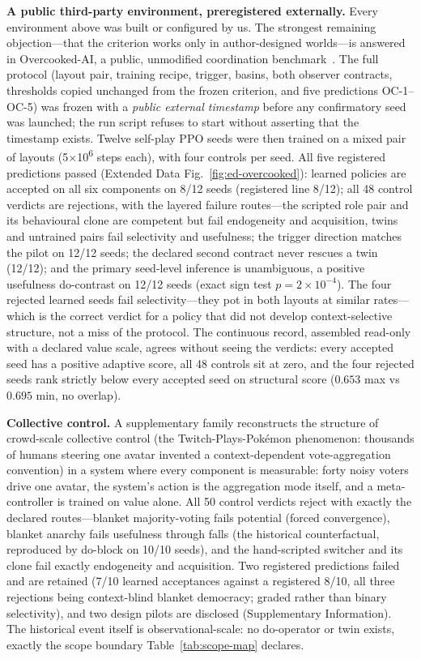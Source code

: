 \documentclass[11pt]{article}
\theoremstyle{definition}
\begin{document}
\textbf{A public third-party environment, preregistered externally.}
Every environment above was built or configured by us. The strongest
remaining objection---that the criterion works only in author-designed
worlds---is answered in Overcooked-AI, a public, unmodified
coordination benchmark~\cite{carroll2019}. The full protocol
(layout pair, training recipe, trigger, basins, both observer
contracts, thresholds copied unchanged from the frozen criterion, and
five predictions OC-1--OC-5) was frozen with a \emph{public external
timestamp} before any confirmatory seed was launched; the run script
refuses to start without asserting that the timestamp exists. Twelve
self-play PPO seeds were then trained on a mixed pair of layouts
(5$\times$10\textsuperscript{6} steps each), with four controls per
seed. All five registered predictions passed (Extended Data
Fig.~\ref{fig:ed-overcooked}): learned policies are accepted on all
six components on 8/12 seeds (registered line 8/12); all 48 control
verdicts are rejections, with the layered failure routes---the
scripted role pair and its behavioural clone are competent but fail
endogeneity and acquisition, twins and untrained pairs fail
selectivity and usefulness; the trigger direction matches the pilot on
12/12 seeds; the declared second contract never rescues a twin
(12/12); and the primary seed-level inference is unambiguous, a
positive usefulness do-contrast on 12/12 seeds (exact sign test
$p=2\times10^{-4}$). The four rejected learned seeds fail
selectivity---they pot in both layouts at similar rates---which is the
correct verdict for a policy that did not develop context-selective
structure, not a miss of the protocol. The continuous record, assembled
read-only with a declared value scale, agrees without seeing the
verdicts: every accepted seed has a positive adaptive score, all 48
controls sit at zero, and the four rejected seeds rank strictly below
every accepted seed on structural score ($0.653$ max vs $0.695$ min,
no overlap).

\textbf{Collective control.}
A supplementary family reconstructs the structure of crowd-scale
collective control (the Twitch-Plays-Pok\'emon phenomenon: thousands
of humans steering one avatar invented a context-dependent
vote-aggregation convention) in a system where every component is
measurable: forty noisy voters drive one avatar, the system's action
is the aggregation mode itself, and a meta-controller is trained on
value alone. All 50 control verdicts reject with exactly the declared
routes---blanket majority-voting fails potential (forced convergence),
blanket anarchy fails usefulness through falls (the historical
counterfactual, reproduced by do-block on 10/10 seeds), and the
hand-scripted switcher and its clone fail exactly endogeneity and
acquisition. Two registered predictions failed and are retained (7/10
learned acceptances against a registered 8/10, all three rejections
being context-blind blanket democracy; graded rather than binary
selectivity), and two design pilots are disclosed (Supplementary
Information). The historical event itself is observational-scale: no
do-operator or twin exists, exactly the scope boundary
Table~\ref{tab:scope-map} declares.
\end{document}
